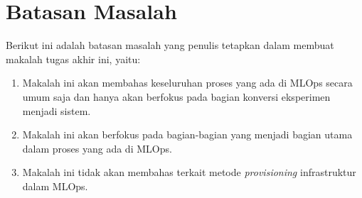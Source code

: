 \section{Batasan Masalah}

Berikut ini adalah batasan masalah yang penulis tetapkan dalam membuat makalah tugas akhir ini, yaitu:

\begin{enumerate}
  \item Makalah ini akan membahas keseluruhan proses yang ada di MLOps secara umum saja dan hanya akan berfokus pada bagian konversi eksperimen menjadi sistem.
  \item Makalah ini akan berfokus pada bagian-bagian yang menjadi bagian utama dalam proses yang ada di MLOps.
  \item Makalah ini tidak akan membahas terkait metode \textit{provisioning} infrastruktur dalam MLOps. 
\end{enumerate}